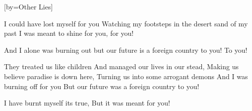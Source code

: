 [by={Other Lies}]

  \chordsoff
  
  \beginverse
  I could have lost myself for you 
  Watching my footsteps in the desert sand of my past
  I was meant to shine for you, for you!
  \endverse

  \beginchorus
  And I alone
  was burning out
  but our future is a foreign country to you! To you!
  \endchorus

  \beginverse  
  They treated us like children
  And managed our lives in our stead, 
  Making us believe paradise is down here,
  Turning us into some arrogant demons  
  And I was burning off for you
  But our future was a foreign country to you! 
  \endverse


  \beginchorus
  I have burnt myself its true,
  But it was meant for you!
  \endchorus
\endsong
